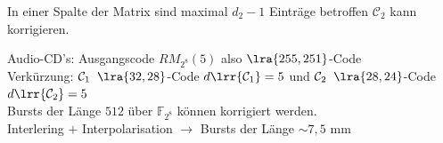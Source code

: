 		In einer Spalte der Matrix sind maximal $d_2-1$ Einträge betroffen $\mathcal{C}_2$ kann korrigieren.
	
		Audio-CD's: Ausgangscode $RM_{2^8}(5)$ also $\lra{255,251}$-Code\\
		Verkürzung: $\mathcal{C}_1\;\;\lra{32,28}$-Code $d\lrr{\mathcal{C}_1}=5$ und $\mathcal{C}_2\;\;\lra{28,24}$-Code $d\lrr{\mathcal{C}_2}=5$\\
		Bursts der Länge $512$ über $\mathbb{F}_{2^8}$ können korrigiert werden.\\
		Interlering $+$ Interpolarisation $\rightarrow$ Bursts der Länge $\sim 7,5\mbox{ mm}$